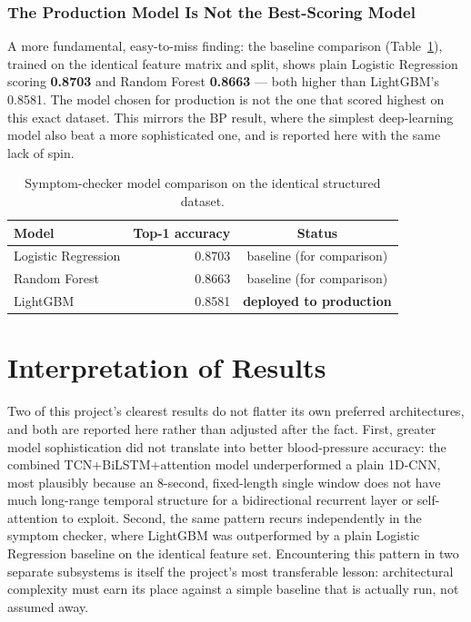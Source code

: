 \documentclass[12pt,a4paper]{report}
\begin{document}
\subsubsection{The Production Model Is Not the Best-Scoring Model}

A more fundamental, easy-to-miss finding: the baseline comparison
(Table~\ref{tab:baselines}), trained on the identical feature matrix and split,
shows plain Logistic Regression scoring \textbf{0.8703} and Random Forest
\textbf{0.8663} --- both higher than LightGBM's 0.8581. The model chosen for
production is not the one that scored highest on this exact dataset. This mirrors
the BP result, where the simplest deep-learning model also beat a more
sophisticated one, and is reported here with the same lack of spin.

\begin{table}[H]
\centering
\caption{Symptom-checker model comparison on the identical structured dataset.}
\label{tab:baselines}
\small
\begin{tabular}{@{}lrc@{}}
\toprule
\textbf{Model} & \textbf{Top-1 accuracy} & \textbf{Status} \\
\midrule
Logistic Regression & 0.8703 & baseline (for comparison) \\
Random Forest & 0.8663 & baseline (for comparison) \\
LightGBM & 0.8581 & \textbf{deployed to production} \\
\bottomrule
\end{tabular}
\end{table}

\section{Interpretation of Results}

Two of this project's clearest results do not flatter its own preferred
architectures, and both are reported here rather than adjusted after the fact.
First, greater model sophistication did not translate into better
blood-pressure accuracy: the combined TCN+BiLSTM+attention model underperformed
a plain 1D-CNN, most plausibly because an 8-second, fixed-length single window
does not have much long-range temporal structure for a bidirectional recurrent
layer or self-attention to exploit. Second, the same pattern recurs
independently in the symptom checker, where LightGBM was outperformed by a plain
Logistic Regression baseline on the identical feature set. Encountering this
pattern in two separate subsystems is itself the project's most transferable
lesson: architectural complexity must earn its place against a simple baseline
that is actually run, not assumed away.
\end{document}

